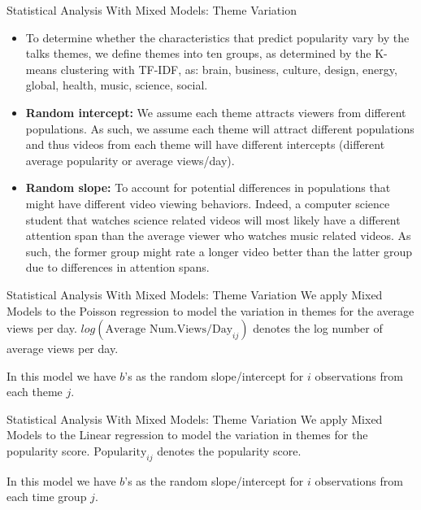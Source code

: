 \begin{frame}{Statistical Analysis With Mixed Models: Theme Variation}
	\begin{itemize}
		\item To determine whether the characteristics that predict popularity vary by the talks themes, we define themes into ten groups, as determined by the K-means clustering with TF-IDF, as: brain, business, culture, design, energy, global, health, music, science, social. 
		\item \textbf{Random intercept: }We assume each theme attracts viewers from different populations. As such, we assume each theme will attract different populations and thus videos from each theme will have different intercepts (different average popularity or average views/day).
		\item \textbf{Random slope: }To account for potential differences in populations that might have different video viewing behaviors. Indeed, a computer science student that watches science related videos will most likely have a different attention span than the average viewer who watches music related videos. As such, the former group might rate a longer video better than the latter group due to differences in attention spans.
	\end{itemize}
\end{frame}


\begin{frame}{Statistical Analysis With Mixed Models: Theme Variation}
We apply Mixed Models to the Poisson regression to model the variation in themes for the average views per day. $log(\text{Average Num.Views/Day}_{ij})$ denotes the log number of average views per day.

In this model we have $b$'s as the random slope/intercept for $i$ observations from each theme $j$.
\end{frame}

\begin{frame}{Statistical Analysis With Mixed Models: Theme Variation}
We apply Mixed Models to the Linear regression to model the variation in themes for the popularity score. $\text{Popularity}_{ij}$ denotes the popularity score.

In this model we have $b$'s as the random slope/intercept for $i$ observations from each time group $j$.
\end{frame}
